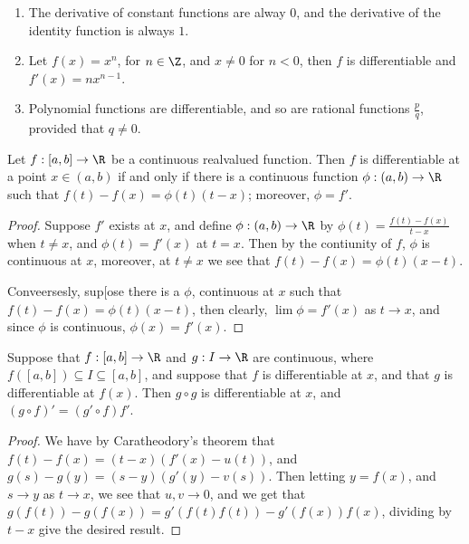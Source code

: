 \begin{example}
    \begin{enumerate}[label=(\arabic*)]
        \item The derivative of constant functions are alway $0$, and the derivative of the 
            identity function is always $1$.

        \item Let  $f(x)=x^n$, for  $n \in \Z$, and  $x \neq 0$ for  $n<0$, then  $f$ 
            is differentiable and  $f'(x)=nx^{n-1}$.

        \item Polynomial functions are differentiable, and so are rational functions  $ \frac{p}{q}$, 
            provided that $q \neq 0$.
    \end{enumerate}		
\end{example} 

\begin{theorem}\label{6.1.3}
    Let $f:[a,b] \rightarrow \R$ be a continuous realvalued function. Then  $f$ is differentiable at 
    a point  $x \in (a,b)$ if and only if there is a continuous function $\phi:(a,b) \rightarrow \R$ 
    such that $f(t)-f(x)=\phi(t)(t-x)$; moreover, $\phi=f'$.
\end{theorem}
\begin{proof}
    Suppose $f'$ exists at  $x$, and define  $\phi:(a,b) \rightarrow \R$ by  $\phi(t)=\frac{f(t)-f(x)}{t-x}$ 
    when $t \neq x$, and $\phi(t)=f'(x)$ at  $t=x$. Then by the contiunity of  $f$, $\phi$ is 
    continuous at  $x$, moreover, at  $t \neq x$ we see that  $f(t)-f(x)=\phi(t)(x-t)$.

    Conveersesly, sup[ose there is a  $\phi$, continuous at $x$ such that  $f(t)-f(x)=\phi(t)(x-t)$, 
    then clearly, $\lim{\phi}=f'(x)$ as $t \rightarrow x$, and since  $\phi$ is continuous, $\phi(x)=f'(x)$.
\end{proof}

\begin{theorem}\label{6.1.4}
    Suppose that $f:[a,b] \rightarrow \R$ and  $g:I \rightarrow \R$ are continuous, where  $f([a,b]) 
    \subseteq I \subseteq [a,b]$, and suppose that $f$ is differentiable at  $x$, and that $g$ 
    is differentiable at $f(x)$. Then  $g \circ g$ is differentiable at  $x$, and  $(g \circ f)'=(g' \circ f)f'$.
\end{theorem}
\begin{proof}
    We have by Caratheodory's theorem that  $f(t)-f(x)=(t-x)(f'(x)-u(t))$, and 
    $g(s)-g(y)=(s-y)(g'(y)-v(s))$. Then letting $y=f(x)$, and  $s \rightarrow y$ as  $t \rightarrow x$, 
    we see that  $u,v \rightarrow 0$, and we get that  $g(f(t))-g(f(x))=g'(f(t)f(t))-g'(f(x))f(x)$, 
    dividing by  $t-x$ give the desired result.
\end{proof}

